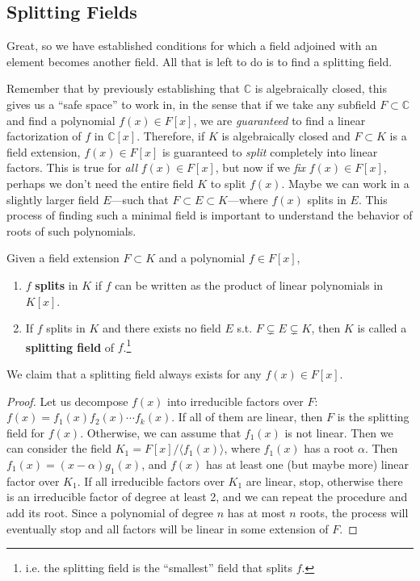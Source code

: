 \subsection{Splitting Fields} 

  Great, so we have established conditions for which a field adjoined with an element becomes another field. All that is left to do is to find a splitting field.

  Remember that by previously establishing that $\mathbb{C}$ is algebraically closed, this gives us a ``safe space'' to work in, in the sense that if we take any subfield $F \subset \mathbb{C}$ and find a polynomial $f(x) \in F[x]$, we are \textit{guaranteed} to find a linear factorization of $f$ in $\mathbb{C}[x]$. Therefore, if $K$ is algebraically closed and $F \subset K$ is a field extension, $f(x) \in F[x]$ is guaranteed to \textit{split} completely into linear factors. This is true for \textit{all} $f(x) \in F[x]$, but now if we \textit{fix} $f(x) \in F[x]$, perhaps we don't need the entire field $K$ to split $f(x)$. Maybe we can work in a slightly larger field $E$---such that $F \subset E \subset K$---where $f(x)$ splits in $E$. This process of finding such a minimal field is important to understand the behavior of roots of such polynomials. 

  \begin{definition}
    Given a field extension $F \subset K$ and a polynomial $f \in F[x]$, 
    \begin{enumerate}
      \item $f$ \textbf{splits} in $K$ if $f$ can be written as the product of linear polynomials in $K[x]$. 
      \item If $f$ splits in $K$ and there exists no field $E$ s.t. $F \subsetneq E \subsetneq K$, then $K$ is called a \textbf{splitting field} of $f$.\footnote{i.e. the splitting field is the ``smallest'' field that splits $f$.} 
    \end{enumerate}
    We claim that a splitting field always exists for any $f(x) \in F[x]$.
  \end{definition}
  \begin{proof}
    Let us decompose $f(x)$ into irreducible factors over $F$: $f(x) = f_1(x)f_2(x)\cdots f_k(x)$. If all of them are linear, then $F$ is the splitting field for $f(x)$. Otherwise, we can assume that $f_1(x)$ is not linear. Then we can consider the field $K_1 = F[x]/\langle f_1(x) \rangle$, where $f_1(x)$ has a root $\alpha$. Then $f_1(x) = (x - \alpha)g_1(x)$, and $f(x)$ has at least one (but maybe more) linear factor over $K_1$. If all irreducible factors over $K_1$ are linear, stop, otherwise there is an irreducible factor of degree at least 2, and we can repeat the procedure and add its root. Since a polynomial of degree $n$ has at most $n$ roots, the process will eventually stop and all factors will be linear in some extension of $F$.
  \end{proof} 

